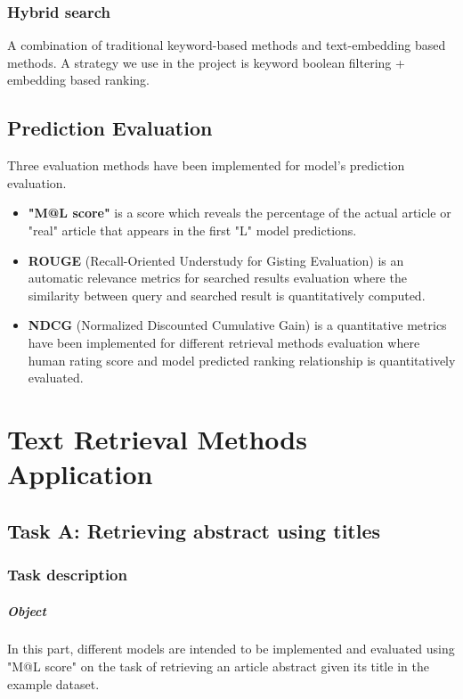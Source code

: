 \subsection{Hybrid search}

A combination of traditional keyword-based methods and text-embedding based methods. 
A strategy we use in the project is keyword boolean filtering + embedding based ranking.


\section{Prediction Evaluation}

Three evaluation methods have been implemented for model's prediction evaluation.

\begin{itemize}
	\item \textbf{"M@L score"} is a score which reveals the percentage of the actual article or "real" article that appears in the first "L" model predictions.
	\item \textbf{ROUGE} (Recall-Oriented Understudy for Gisting Evaluation) is an automatic relevance metrics for searched results evaluation where the similarity between query and searched result is quantitatively computed.
	\item \textbf{NDCG} (Normalized Discounted Cumulative Gain) is a quantitative metrics have been implemented for different retrieval methods evaluation where human rating score and model predicted ranking relationship is quantitatively evaluated.
\end{itemize}

\chapter{Text Retrieval Methods Application}

\section{Task A: Retrieving abstract using titles}
\subsection{Task description}

\paragraph{Object}
In this part, different models are intended to be implemented and evaluated using "M@L score" on the task of retrieving an article abstract given its title in the example dataset.

